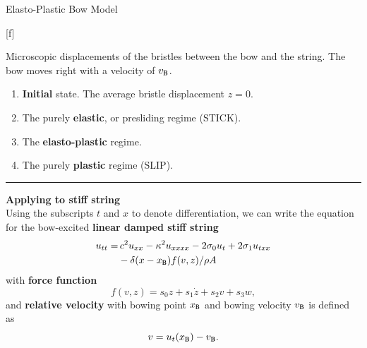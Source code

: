 \documentclass[a0paper,portrait]{baposter}
\let\oldtext\text
\renewcommand{\text}[1]{\oldtext{\fontfamily{ptm}\selectfont #1}}
\let\oldbf\textbf
\renewcommand{\textbf}[1]{\textcolor{aaublue1}{\oldbf{#1}}}
\begin{document}
\begin{poster}
\begin{posterbox}[name=elasto,column=0,below=intro, above=bottom]{Elasto-Plastic Bow Model}
\begin{center}
\begin{tikzpicture}[scale=0.84, every node/.style={transform shape}]
    \end{tikzpicture}
    \captionsetup{singlelinecheck=off}
    [f]{%
    Microscopic displacements of the bristles between the bow and the string. The bow moves right with a velocity of $v_\text{B}$.
    \begin{enumerate}[labelindent=-2.4pt, label=\alph*), font=\color{black}]
        \item \textbf{Initial} state. The average bristle displacement $z=0$.
        \item The purely \textbf{elastic}, or presliding regime (STICK).
        \item The \textbf{elasto-plastic} regime. 
        \item The purely \textbf{plastic} regime (SLIP).
    \end{enumerate}
}
    \label{fig:elasto}
    \end{center}
    \hrule
    \vspace{0.2cm}
    {\large \textbf{Applying to stiff string}}\\
        Using the subscripts $t$ and $x$ to denote differentiation, we can write the equation for the bow-excited \textbf{linear damped stiff string}
    \begin{equation}
\begin{aligned}\label{eq:stiffString}
  u_{tt} = &\, c^2u_{xx}-\kappa^2u_{xxxx}-2\sigma_0u_t+2\sigma_1u_{txx}\\
  &-\delta(x-x_\text{B})f(v,z)/\rho A
  \end{aligned}
\end{equation}
with \textbf{force function}
\vspace{0.1cm}
\begin{equation}
    f(v,z) = s_0z+s_1\dot{z}+s_2v+s_3w,
\end{equation}
    and \textbf{relative velocity} with bowing point $x_\text{B}$ and bowing velocity $v_\text{B}$ is defined as
\begin{equation}
    v = u_t(x_\text{B})-v_\text{B}.
\end{equation}


\end{posterbox}
\end{poster}
\end{document}
